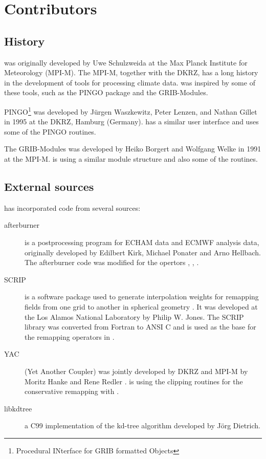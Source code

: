 \chapter{Contributors}

\section{History}

{\CDO} was originally developed by Uwe Schulzweida at the Max Planck Institute for Meteorology (MPI-M).
The MPI-M, together with the DKRZ, has a long history in the development of tools for processing climate data.
{\CDO} was inspired by some of these tools, such as the PINGO package and the GRIB-Modules.

PINGO\footnote{Procedural INterface for GRIB formatted Objects} was developed by J\"urgen Waszkewitz,
 Peter Lenzen, and Nathan Gillet in 1995 at the DKRZ, Hamburg (Germany).
{\CDO} has a similar user interface and uses some of the PINGO routines.

The GRIB-Modules was developed by Heiko Borgert and Wolfgang Welke in 1991 at the MPI-M.
{\CDO} is using a similar module structure and also some of the routines.

\section{External sources}

{\CDO} has incorporated code from several sources:

\begin{description}
\item[afterburner] is a postprocessing program for ECHAM data and ECMWF analysis data,
originally developed by Edilbert Kirk, Michael Ponater and Arno Hellbach.
The afterburner code was modified for the {\CDO} opertors  {},  {},  {}.

\item[SCRIP] is a software package used to generate interpolation weights for remapping
fields from one grid to another in spherical geometry \cite{SCRIP}.
It was developed at the Los Alamos National Laboratory by Philip W. Jones.
The SCRIP library was converted from Fortran to ANSI C and is used as
the base for the remapping operators in {\CDO}.

\item[YAC] (Yet Another Coupler) was jointly developed by DKRZ and MPI-M by Moritz Hanke and Rene Redler \cite{YAC}.
{\CDO} is using the clipping routines for the conservative remapping with {}.

\item[libkdtree] a C99 implementation of the kd-tree algorithm developed by J\"org Dietrich.
\end{description}

